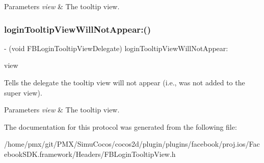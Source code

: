 \begin{DoxyParams}{Parameters}
{\em view} & The tooltip view. \\
\hline
\end{DoxyParams}
\mbox{\label{protocolFBLoginTooltipViewDelegate_01-p_a90d8a02f0672da781a5b50e517f75685}} 
\subsubsection{\texorpdfstring{login\+Tooltip\+View\+Will\+Not\+Appear\+:()}{loginTooltipViewWillNotAppear:()}\hspace{0.1cm}{\footnotesize\ttfamily [5/5]}}
{\footnotesize\ttfamily -\/ (void F\+B\+Login\+Tooltip\+View\+Delegate) login\+Tooltip\+View\+Will\+Not\+Appear\+: \begin{DoxyParamCaption}\item[{(\hyperlink{interfaceFBLoginTooltipView}{F\+B\+Login\+Tooltip\+View} $\ast$)}]{view }\end{DoxyParamCaption}\hspace{0.3cm}{\ttfamily [optional]}}

Tells the delegate the tooltip view will not appear (i.\+e., was not added to the super view).


\begin{DoxyParams}{Parameters}
{\em view} & The tooltip view. \\
\hline
\end{DoxyParams}


The documentation for this protocol was generated from the following file\+:\begin{DoxyCompactItemize}
\item 
/home/pmx/git/\+P\+M\+X/\+Simu\+Cocos/cocos2d/plugin/plugins/facebook/proj.\+ios/\+Facebook\+S\+D\+K.\+framework/\+Headers/F\+B\+Login\+Tooltip\+View.\+h\end{DoxyCompactItemize}
